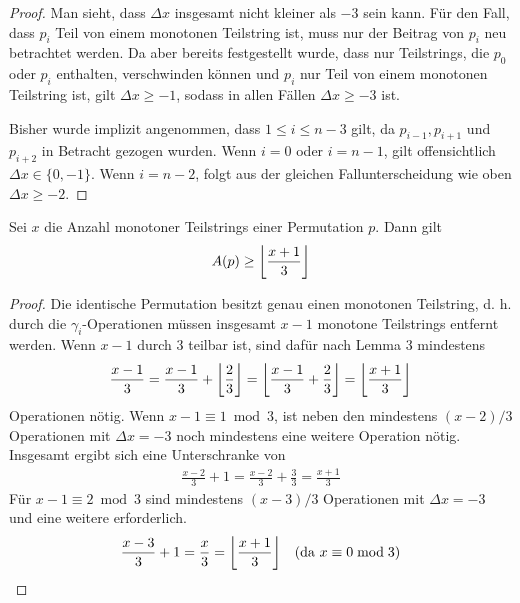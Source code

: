 \documentclass[a4paper, 10pt, ngerman]{article}
\begin{document}
\begin{proof}
    \noindent Man sieht, dass $\Delta x$ insgesamt nicht kleiner als $-3$ sein kann. Für den Fall, dass $p_i$ Teil von einem monotonen Teilstring ist, muss nur der Beitrag von $p_i$ neu betrachtet werden. Da aber bereits festgestellt wurde, dass nur Teilstrings, die $p_0$ oder $p_i$ enthalten, verschwinden können und $p_i$ nur Teil von einem monotonen Teilstring ist, gilt $\Delta x \ge -1$, sodass in allen Fällen $\Delta x \ge - 3$ ist.

    Bisher wurde implizit angenommen, dass $1 \le i \le n - 3$ gilt, da $p_{i-1}, p_{i + 1}$ und $p_{i + 2}$ in Betracht gezogen wurden. Wenn $i = 0$ oder $i = n - 1$, gilt offensichtlich $\Delta x \in \{0, -1\}$. Wenn $i = n - 2$, folgt aus der gleichen Fallunterscheidung wie oben $\Delta x \ge -2$.
\end{proof}

\begin{theorem}
    Sei $x$ die Anzahl monotoner Teilstrings einer Permutation $p$. Dann gilt
    $$ A(p) \ge \bigg{\lfloor} \frac {x + 1} 3 \bigg{\rfloor} $$
\end{theorem}

\begin{proof}
    Die identische Permutation besitzt genau einen monotonen Teilstring, d. h. durch die $\gamma_i$-Operationen müssen insgesamt $x - 1$ monotone Teilstrings entfernt werden. Wenn $x - 1$ durch 3 teilbar ist, sind dafür nach Lemma 3 mindestens
    \begin{align*}
        \frac {x - 1} 3 = \frac {x - 1} 3 + \bigg{\lfloor} \frac 2 3 \bigg{\rfloor}
        = \bigg{\lfloor} \frac {x - 1} 3 + \frac 2 3 \bigg{\rfloor} =
        \bigg{\lfloor} \frac {x + 1} 3 \bigg{\rfloor}
    \end{align*}
    Operationen nötig. Wenn $x - 1 \equiv 1 \bmod 3$, ist neben den mindestens $(x - 2)/3$ Operationen mit $\Delta x = -3$ noch mindestens eine weitere Operation nötig. Insgesamt ergibt sich eine Unterschranke von
    \begin{align*}
        \frac {x - 2} 3 + 1 = \frac {x - 2} 3 + \frac 3 3 = \frac {x + 1} 3
    \end{align*}
    Für $x - 1 \equiv 2 \bmod 3$ sind mindestens $(x - 3) / 3$ Operationen mit $\Delta x = -3$ und eine weitere erforderlich.
    \begin{align*}
        \frac {x - 3} 3 + 1 = \frac x 3 = \bigg{\lfloor} \frac {x + 1} 3 \bigg{\rfloor} \quad (\text{da } x \equiv 0 \bmod 3)
    \end{align*}
\end{proof}
\end{document}
